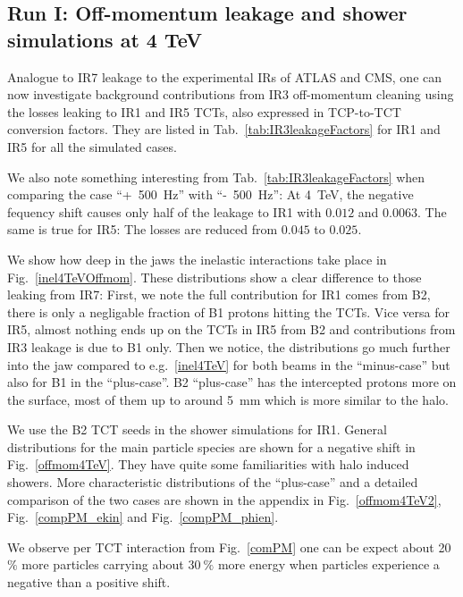 \newpage
\subsection{Run I: Off-momentum leakage and shower simulations at 4 TeV}

Analogue to IR7 leakage to the experimental IRs of ATLAS and CMS, one can now investigate background contributions from IR3 off-momentum cleaning using the losses leaking to IR1 and IR5 TCTs, also expressed in TCP-to-TCT conversion factors. They are listed in Tab.~\ref{tab:IR3leakageFactors} for IR1 and IR5 for all the simulated cases.

We also note something interesting from Tab.~\ref{tab:IR3leakageFactors} when comparing the case ``+~500~Hz'' with ``-~500~Hz'': At 4~TeV, the negative fequency shift causes only half of the leakage to IR1 with $0.012$ and $0.0063$. The same is true for IR5: The losses are reduced from $0.045$ to $0.025$.

We show how deep in the jaws the inelastic interactions take place in Fig.~\ref{inel4TeVOffmom}. These distributions show a clear difference to those leaking from IR7: First, we note the full contribution for IR1 comes from B2, there is only a negligable fraction of B1 protons hitting the TCTs. Vice versa for IR5, almost nothing ends up on the TCTs in IR5 from B2 and contributions from IR3 leakage is due to B1 only. Then we notice, the distributions go much further into the jaw compared to e.g.~\ref{inel4TeV} for both beams in the ``minus-case'' but also for B1 in the ``plus-case''. B2 ``plus-case'' has the intercepted protons more on the surface, most of them up to around 5~mm which is more similar to the halo. 

We use the B2 TCT seeds in the shower simulations for IR1. General distributions for the main particle species are shown for a negative shift in Fig.~\ref{offmom4TeV}. They have quite some familiarities with halo induced showers. More characteristic distributions of the ``plus-case'' and a detailed comparison of the two cases are shown in the appendix in Fig.~\ref{offmom4TeV2}, Fig.~\ref{compPM_ekin} and Fig.~\ref{compPM_phien}.

We observe per TCT interaction from Fig.~\ref{comPM} one can be expect about 20~$\%$ more particles carrying about 30$~\%$ more energy when particles experience a negative than a positive shift.


